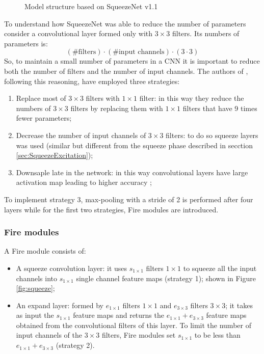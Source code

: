 \begin{figure}[H]
    \vspace{0.8em}
    \centering
    \resizebox{.4\textwidth}{!}{}
    \caption{Model structure based on SqueezeNet v1.1 \label{fig:squeezeDiag}}
\end{figure}

\noindent
To understand how SqueezeNet was able to reduce the number of parameters consider a convolutional layer
formed only with $3\!\times\!3$ filters. Its numbers of parameters is:
$$ (\text{\# filters})\cdot(\text{\# input channels})\cdot(3\cdot 3) $$
So, to maintain a small number of parameters in a CNN it is important to reduce both the number of filters
and the number of input channels.
The authors of \cite{iandola2016squeezenetalexnetlevelaccuracy50x}, following this reasoning, have employed
three strategies:

\begin{enumerate}
    \item Replace most of $3\!\times\!3$ filters with $1\!\times\!1$ filter: in this way they reduce the numbers 
    of $3\!\times\!3$ filters by replacing them with $1\!\times\!1$ filters that have 9 times fewer parameters;
    \item Decrease the number of input channels of $\!3\times\!3$ filters: to do so squeeze layers was used 
    (similar but different from the squeeze phase described in secction \ref{sec:SqueezeExcitation});
    \item Downsaple late in the network: in this way convolutional layers have large activation map
        leading to higher accuracy \cite{he2014convolutionalneuralnetworksconstrained}; 
\end{enumerate}
\noindent

To implement strategy 3, max-pooling with a stride of 2 is performed after four layers while for the first two
strategies, Fire modules are introduced.

\subsubsection{Fire modules}
A Fire module consists of:
\begin{itemize}
    \item A squeeze convolution layer: it uses $s_{1\!\times\!1}$ filters $1\!\times\!1$ to squeeze all
        the input channels into $s_{1\!\times\!1}$ single channel feature maps (strategy 1); shown in Figure 
        \ref{fig:squeeze};
    \item An expand layer: formed by $e_{1\!\times\!1}$ filters $1\!\times\!1$ and $e_{3\!\times\!3}$ 
        filters $3\!\times\!3$; it takes as input the $s_{1\!\times\!1}$ feature maps and returns the
        $e_{1\!\times\!1}+e_{3\!\times\!3}$ feature maps obtained from the convolutional filters of this 
        layer. To limit the number of input channels of the $3\!\times\!3$ filters, Fire modules set 
        $s_{1\!\times\!1}$ to be less than $e_{1\!\times\!1}+e_{3\!\times\!3}$ (strategy 2).
\end{itemize}

